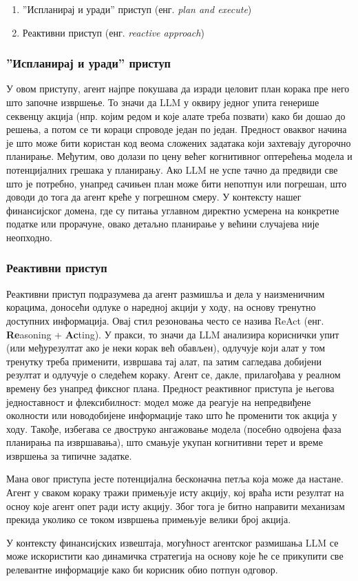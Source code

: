 \begin{enumerate}
\item ”Испланирај и уради” приступ (енг. \textit{plan and execute})
\item Реактивни приступ (енг. \textit{reactive approach})
\end{enumerate}

\subsubsection{”Испланирај и уради” приступ}

У овом приступу, агент најпре покушава да изради целовит план корака пре него што започне извршење. То значи да LLM у оквиру једног упита генерише секвенцу акција (нпр. којим редом и које алате треба позвати) како би дошао до решења, а потом се ти кораци спроводе један по један. Предност оваквог начина је што може бити користан код веома сложених задатака који захтевају дугорочно планирање. Међутим, ово долази по цену већег когнитивног оптерећења модела и потенцијалних грешака у планирању. Ако LLM не успе тачно да предвиди све што је потребно, унапред сачињен план може бити непотпун или погрешан, што доводи до тога да агент креће у погрешном смеру. У контексту нашег финансијског домена, где су питања углавном директно усмерена на конкретне податке или прорачуне, овако детаљно планирање у већини случајева није неопходно.

\subsubsection{Реактивни приступ}
\label{sec:reactive_approach}

Реактивни приступ подразумева да агент размишља и дела у наизменичним корацима, доносећи одлуке о наредној акцији у ходу, на основу тренутно доступних информација. Овај стил резоновања често се назива ReAct (енг. \textbf{Re}asoning + \textbf{Ac}ting). У пракси, то значи да LLM анализира кориснички упит (или међурезултат ако је неки корак већ обављен), одлучује који алат у том тренутку треба применити, извршава тај алат, па затим сагледава добијени резултат и одлучује о следећем кораку. Агент се, дакле, прилагођава у реалном времену без унапред фиксног плана. Предност реактивног приступа је његова једноставност и флексибилност: модел може да реагује на непредвиђене околности или новодобијене информације тако што ће променити ток акција у ходу. Такође, избегава се двоструко ангажовање модела (посебно одвојена фаза планирања па извршавања), што смањује укупан когнитивни терет и време извршења за типичне задатке. 
\newline

Мана овог приступа јесте потенцијална бесконачна петља која може да настане. Агент у сваком кораку тражи примењује исту акцију, кој враћа исти резултат на осноу које агент опет ради исту акцију. Због тога је битно направити механизам прекида уколико се током извршења примењује велики број акција.
\newline

У контексту финансијских извештаја, могућност агентског размишања LLM се може искористити као динамичка стратегија на основу које ће се прикупити све релевантне информације како би корисник обио потпун одговор.